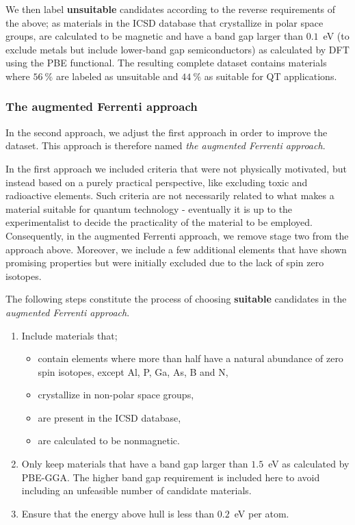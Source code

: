 \documentclass[superscriptaddress,unsortedaddress,
 amsmath,amssymb,
 aps,
]{revtex4-2}
\begin{document}
We then label \textbf{unsuitable} candidates according to the reverse requirements of the above; as materials in the ICSD database that crystallize in polar space groups, are calculated 
to be magnetic and have a band gap larger than $0.1$~eV (to exclude metals but include lower-band gap semiconductors) as calculated by DFT using the PBE functional.
The resulting complete dataset contains materials where $56 \ \%$ are labeled as unsuitable and $44 \ \%$ as suitable for QT applications. 

\subsubsection*{The augmented Ferrenti approach}
In the second approach, we adjust the first approach in order to improve the dataset. This approach is therefore named \emph{the augmented Ferrenti approach}.

In the first approach we included criteria that were not physically motivated, but instead based on a purely practical perspective, like excluding toxic and radioactive elements. Such criteria are not necessarily related to what makes a material suitable for quantum technology - eventually it is up to the experimentalist to decide the practicality of the material to be employed. 
Consequently, in the augmented Ferrenti approach, we remove stage two from the approach above. Moreover, we include a few additional elements that have shown promising properties but were initially excluded due to the lack of spin zero isotopes. 

The following steps constitute the process of choosing \textbf{suitable} candidates 
in the \emph{augmented Ferrenti approach}. 
\begin{enumerate}
    \item Include materials that; 
    \begin{itemize}
        \item contain elements where more than half have a natural abundance of zero spin isotopes, except Al, P, Ga, As, B and N, 
        \item crystallize in non-polar space groups,
        \item are present in the ICSD database,
        \item are calculated to be nonmagnetic. 
    \end{itemize}
    \item Only keep materials that have a band gap larger than $1.5$~eV as calculated by PBE-GGA. The higher band gap requirement is included here to avoid including an unfeasible number of candidate materials. 
    \item Ensure that the energy above hull is less than $0.2$~eV per atom. 
\end{enumerate}
\end{document}
